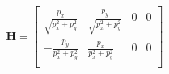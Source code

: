         \begin{equation}
            \mathbf{H}=
            \begin{bmatrix}
                \frac{p_x}{\sqrt{p_x^2+p_y^2}} & \frac{p_y}{\sqrt{p_x^2+p_y^2}} & 0 & 0 \\
                -\frac{p_y}{p_x^2+p_y^2} & \frac{p_x}{p_x^2+p_y^2} & 0 & 0 \\
            \end{bmatrix}
        \end{equation}
    \endgroup